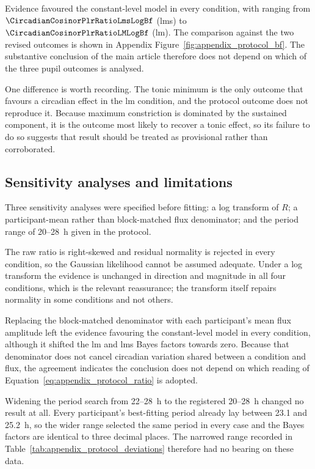 \begin{appendixbox}
Evidence favoured the constant-level model in every condition, with \logbf{} ranging from $\CircadianCosinorPlrRatioLmsLogBf$ (\acs{lms}) to $\CircadianCosinorPlrRatioLMLogBf$ (\acs{lm}). The comparison against the two revised outcomes is shown in Appendix Figure~\ref{fig:appendix_protocol_bf}. The substantive conclusion of the main article therefore does not depend on which of the three pupil outcomes is analysed.

One difference is worth recording. The tonic minimum is the only outcome that favours a circadian effect in the \acs{lm} condition, and the protocol outcome does not reproduce it. Because maximum constriction is dominated by the sustained component, it is the outcome most likely to recover a tonic effect, so its failure to do so suggests that result should be treated as provisional rather than corroborated.

\subsection{Sensitivity analyses and limitations}

Three sensitivity analyses were specified before fitting: a log transform of $R$; a participant-mean rather than block-matched \acs{flux} denominator; and the period range of 20--28~h given in the protocol.

The raw ratio is right-skewed and residual normality is rejected in every condition, so the Gaussian likelihood cannot be assumed adequate. Under a log transform the evidence is unchanged in direction and magnitude in all four conditions, which is the relevant reassurance; the transform itself repairs normality in some conditions and not others.

Replacing the block-matched denominator with each participant's mean \acs{flux} amplitude left the evidence favouring the constant-level model in every condition, although it shifted the \acs{lm} and \acs{lms} Bayes factors towards zero. Because that denominator does not cancel circadian variation shared between a condition and \acs{flux}, the agreement indicates the conclusion does not depend on which reading of Equation~\ref{eq:appendix_protocol_ratio} is adopted.

Widening the period search from 22--28~h to the registered 20--28~h changed no result at all. Every participant's best-fitting period already lay between 23.1 and 25.2~h, so the wider range selected the same period in every case and the Bayes factors are identical to three decimal places. The narrowed range recorded in Table~\ref{tab:appendix_protocol_deviations} therefore had no bearing on these data.


\end{appendixbox}
